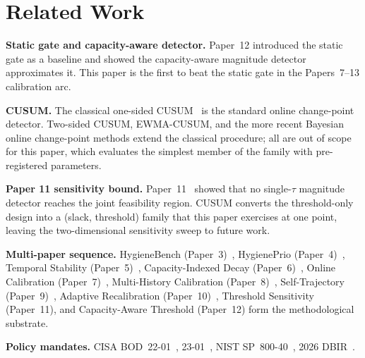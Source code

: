 \section{Related Work}

\textbf{Static gate and capacity-aware detector.} Paper~12 introduced
the static gate as a baseline and showed the capacity-aware
magnitude detector~\cite{paper12capaware} approximates it. This
paper is the first to beat the static gate in the Papers~7--13
calibration arc.

\textbf{CUSUM.} The classical one-sided CUSUM~\cite{page1954cusum}
is the standard online change-point detector. Two-sided CUSUM,
EWMA-CUSUM, and the more recent Bayesian online change-point
methods extend the classical procedure; all are out of scope for
this paper, which evaluates the simplest member of the family with
pre-registered parameters.

\textbf{Paper 11 sensitivity bound.} Paper~11~\cite{paper11tau}
showed that no single-$\tau$ magnitude detector reaches the joint
feasibility region. CUSUM converts the threshold-only design into
a (slack, threshold) family that this paper exercises at one
point, leaving the two-dimensional sensitivity sweep to future work.

\textbf{Multi-paper sequence.} HygieneBench
(Paper~3)~\cite{paper3hygienebench}, HygienePrio
(Paper~4)~\cite{paper4hygieneprio}, Temporal Stability
(Paper~5)~\cite{paper5temporal}, Capacity-Indexed Decay
(Paper~6)~\cite{paper6capacity}, Online Calibration
(Paper~7)~\cite{paper7online}, Multi-History Calibration
(Paper~8)~\cite{paper8multi}, Self-Trajectory
(Paper~9)~\cite{paper9selftraj}, Adaptive Recalibration
(Paper~10)~\cite{paper10adaptive}, Threshold Sensitivity
(Paper~11), and Capacity-Aware Threshold (Paper~12) form the
methodological substrate.

\textbf{Policy mandates.} CISA BOD~22-01~\cite{cisa2021bod2201},
23-01~\cite{cisa2022bod2301}, NIST SP~800-40~\cite{nist2022sp80040r4},
2026 DBIR~\cite{verizon2026dbir}.
